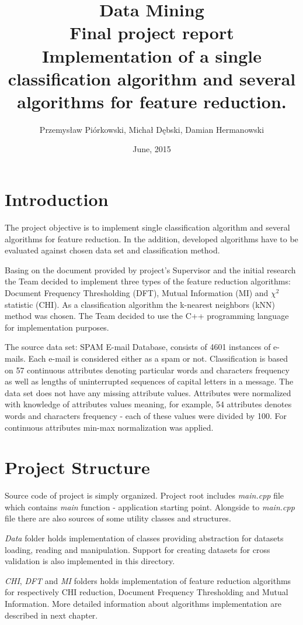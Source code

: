 \documentclass[12pt,a4paper]{report}
\title{Data Mining\\Final project report\\
	\large Implementation of a single classification algorithm and several algorithms for feature reduction.}
\date{June, 2015}
\author{Przemysław Piórkowski, Michał Dębski, Damian Hermanowski}
\begin{document}
\maketitle 
\tableofcontents
\chapter{Introduction}
The project objective is to implement single classification algorithm and several algorithms for feature reduction. In the addition, developed algorithms have to be evaluated against chosen data set and classification method.

Basing on the document provided by project's Supervisor and the initial research the Team decided to implement three types of the feature reduction algorithms: Document Frequency Thresholding (DFT), Mutual Information (MI) and \({\chi}^2\) statistic (CHI). As a classification algorithm the k-nearest neighbors (kNN) method was chosen. The Team decided to use the C++ programming language for implementation purposes.

The source data set: SPAM E-mail Database, consists of 4601 instances of e-mails. Each e-mail is considered either as a spam or not. Classification is based on 57 continuous attributes denoting particular words and characters frequency as well as lengths of uninterrupted sequences of capital letters in a message. The data set does not have any missing attribute values. Attributes were normalized with knowledge of attributes values meaning, for example, 54 attributes denotes words and characters frequency - each of these values were divided by 100. For continuous attributes min-max normalization was applied.

\chapter{Project Structure}
Source code of project is simply organized. Project root includes \textit{main.cpp} file which contains \textit{main} function - application starting point. Alongside to \textit{main.cpp} file there are also sources of some utility classes and structures. 

\textit{Data} folder holds implementation of classes providing abstraction for datasets loading, reading and manipulation. Support for creating datasets for cross validation is also implemented in this directory.

\textit{CHI}, \textit{DFT} and \textit{MI} folders holds implementation of feature reduction algorithms for respectively CHI reduction,  Document Frequency Thresholding and Mutual Information. More detailed information about algorithms implementation are described in next chapter.
\end{document}
